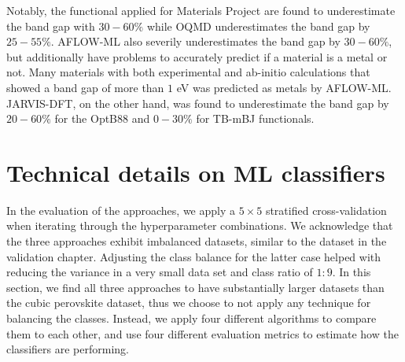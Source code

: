 Notably, the functional applied for Materials Project are found to underestimate the band gap with $30-60\%$ while OQMD underestimates the band gap by $25-55\%$. AFLOW-ML also severily underestimates the band gap by $30-60\%$, but additionally have problems to accurately predict if a material is a metal or not. Many materials with both experimental and ab-initio calculations that showed a band gap of more than $1$ eV was predicted as metals by AFLOW-ML. JARVIS-DFT, on the other hand, was found to underestimate the band gap by $20-60\%$ for the OptB88 and $0-30\%$ for TB-mBJ functionals.





\section{Technical details on ML classifiers}


In the evaluation of the approaches, we apply a $5\times 5$ stratified cross-validation when iterating through the hyperparameter combinations. We acknowledge that the three approaches exhibit imbalanced datasets, similar to the dataset in the validation chapter. Adjusting the class balance for the latter case helped with reducing the variance in a very small data set and class ratio of $1:9$. In this section, we find all three approaches to have substantially larger datasets than the cubic perovskite dataset, thus we choose to not apply any technique for balancing the classes. Instead, we apply four different algorithms to compare them to each other, and use four different evaluation metrics to estimate how the classifiers are performing. %

